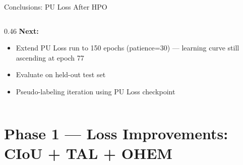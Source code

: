 \documentclass[aspectratio=169, 10pt]{beamer}
\begin{document}
\begin{frame}{Conclusions: PU Loss After HPO}
\begin{columns}[T]
\begin{column}{0.46\textwidth}
      \vspace{6pt}
      \textbf{Next:}
      \begin{itemize}\small
        \item Extend PU Loss run to 150 epochs (patience=30) — learning curve still ascending at epoch 77
        \item Evaluate on held-out test set
        \item Pseudo-labeling iteration using PU Loss checkpoint
      \end{itemize}
    \end{column}
  \end{columns}
\end{frame}


\section{Phase 1 — Loss Improvements: CIoU + TAL + OHEM}
\end{document}
